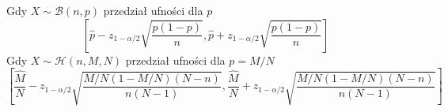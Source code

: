\documentclass[12pt]{mwrep}
\begin{document}
	
Gdy $X\sim\mathcal{B}(n,p)$ przedział ufności dla $p$
\begin{equation}
\left[\hat{p}-z_{1-\alpha/2}\sqrt{\frac{p(1-p)}{n}},\hat{p}+z_{1-\alpha/2}\sqrt{\frac{p(1-p)}{n}}\right]
\end{equation}
Gdy $X\sim\mathcal{H}(n,M,N)$ przedział ufności dla $p=M/N$
\begin{equation}
\left[\frac{\hat{M}}{N}-z_{1-\alpha/2} \sqrt{\frac{M/N(1-M/N)(N-n)}{n(N-1)}},\frac{\hat{M}}{N} + z_{1-\alpha/2} \sqrt{\frac{M/N(1-M/N)(N-n)}{n(N-1)}}\right]
\end{equation}
\end{document}
